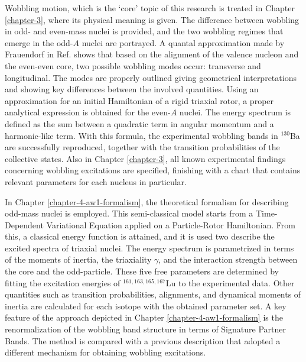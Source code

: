 Wobbling motion, which is the `core' topic of this research is treated in Chapter \ref{chapter-3}, where its physical meaning is given. The difference between wobbling in odd- and even-mass nuclei is provided, and the two wobbling regimes that emerge in the odd-$A$ nuclei are portrayed. A quantal approximation made by Frauendorf in Ref. \cite{frauendorf2014transverse} shows that based on the alignment of the valence nucleon and the even-even core, two possible wobbling modes occur: transverse and longitudinal. The modes are properly outlined giving geometrical interpretations and showing key differences between the involved quantities. Using an approximation for an initial Hamiltonian of a rigid triaxial rotor, a proper analytical expression is obtained for the even-$A$ nuclei. The energy spectrum is defined as the sum between a quadratic term in angular momentum and a harmonic-like term. With this formula, the experimental wobbling bands in $^{130}$Ba are successfully reproduced, together with the transition probabilities of the collective states. Also in Chapter \ref{chapter-3}, all known experimental findings concerning wobbling excitations are specified, finishing with a chart that contains relevant parameters for each nucleus in particular. 

In Chapter \ref{chapter-4-aw1-formalism}, the theoretical formalism for describing odd-mass nuclei is employed. This semi-classical model starts from a Time-Dependent Variational Equation applied on a Particle-Rotor Hamiltonian. From this, a classical energy function is attained, and it is used two describe the excited spectra of triaxial nuclei. The energy spectrum is parametrized in terms of the moments of inertia, the triaxiality $\gamma$, and the interaction strength between the core and the odd-particle. These five free parameters are determined by fitting the excitation energies of $^{161,163,165,167}$Lu to the experimental data. Other quantities such as transition probabilities, alignments, and dynamical moments of inertia are calculated for each isotope with the obtained parameter set. A key feature of the approach depicted in Chapter \ref{chapter-4-aw1-formalism} is the renormalization of the wobbling band structure in terms of Signature Partner Bands. The method is compared with a previous description that adopted a different mechanism for obtaining wobbling excitations.

